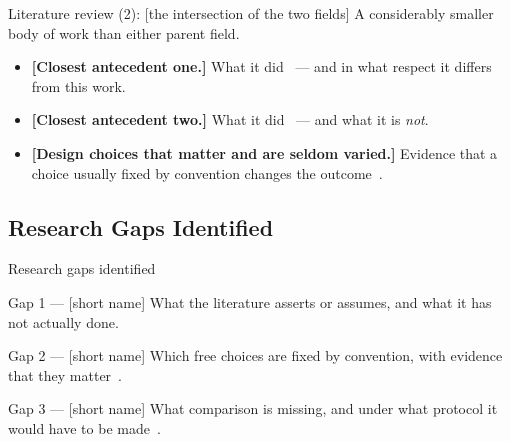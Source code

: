 \documentclass[aspectratio=43, 11pt, xcolor=dvipsnames, compress]{beamer}
\renewcommand{\cite}[2][]{\unskip}   %
\begin{document}
\begin{frame}{Literature review (2): [the intersection of the two fields]}
  \small
  A considerably smaller body of work than either parent field.
  \begin{itemize}
    \item \textbf{[Closest antecedent one.]} What it did~\cite{example_article} --- and in what respect it differs from this work.
    \item \textbf{[Closest antecedent two.]} What it did~\cite{example_inproceedings} --- and what it is \emph{not}.
    \item \textbf{[Design choices that matter and are seldom varied.]} Evidence that a choice usually fixed by convention changes the outcome~\cite{example_book}.
  \end{itemize}
\end{frame}

\subsection{Research Gaps Identified}
\begin{frame}{Research gaps identified}
  \small
  \begin{block}{Gap 1 --- [short name]}
    What the literature asserts or assumes, and what it has not actually done.
  \end{block}
  \begin{block}{Gap 2 --- [short name]}
    Which free choices are fixed by convention, with evidence that they matter~\cite{example_article}.
  \end{block}
  \begin{block}{Gap 3 --- [short name]}
    What comparison is missing, and under what protocol it would have to be made~\cite{example_inproceedings}.
  \end{block}
\end{frame}

\end{document}
